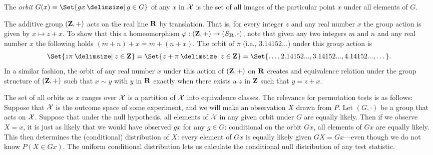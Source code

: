 \begin{definition}
The \emph{orbit} $G(x) \equiv \Set{gx  \given g \in G}$ of any $x$ in $\mathcal{X}$ is
the set of all images of the particular point $x$ under all elements of $G$.
\end{definition}


\begin{example}
The additive group $(\mathbf{Z}, +)$ acts on the real line $\mathbf{R}$ by translation.
That is, for every integer $z$ and any real number $x$ the group action is given
by $x \mapsto z + x$. To show that this a homeomorphism $\varphi : (\ints, +) \to (S_\reals, \smallcirc)$,
note that given any two integers $m$ and $n$ and any real number $x$ the following
holds $(m + n) + x = m + (n + x)$.  The orbit of $\pi$ (i.e., $3.14152...$) under
this group action is
\begin{align*}
\Set{z\pi  \given z \in \ints} = \Set{z + \pi  \given z \in \ints} =\Set{\dots, 2.14152..., 3.14152..., 4.14152..., \dots}.
\end{align*}
In a similar fashion, the orbit of any real number $x$ under this action of $(\mathbf{Z}, +)$
on $\mathbf{R}$ creates and equivalence relation under the group structure of $(\mathbf{Z}, +)$ such
that $x \sim y$ with $y$ in $\mathbf{R}$ exactly when there exists a $z$ in $\mathbf{Z}$ such that
$y = z + x$.
\end{example}

The set of all orbits as $x$ ranges over $\mathcal{X}$ is a partition of $\mathcal{X}$ into equivalence classes.
The relevance for permutation tests is as follows: Suppose that $\mathcal{X}$ is the outcome
space of some experiment, and we will make an observation $X$ drawn from $P$.
Let $(G, \cdot)$ be a group that acts on $\mathcal{X}$.
Suppose that under the null hypothesis, all elements of $\mathcal{X}$ in any given orbit under $G$ 
are equally likely.
Then if we observe $X=x$, it is just as likely that we would have observed $gx$ for any
$g \in G$: conditional on the orbit $Gx$, all elements of $Gx$ are equally likely.
This then determines the (conditional) distribution of $X$: every element of $Gx$ is equally
likely given $GX = Gx$---even though we do not know $P(X \in Gx)$.
The uniform conditional distribution lets us calculate the conditional null distribution of
any test statistic.

